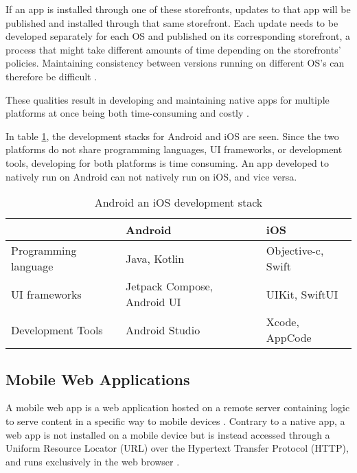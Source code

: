 \documentclass[a4paper,12pt]{article}
\begin{document}
If an app is installed through one of these storefronts, updates to that app will be published and installed through that same storefront. Each update needs to be developed separately for each OS and published on its corresponding storefront, a process that might take different amounts of time depending on the storefronts’ policies. Maintaining consistency between versions running on different OS’s can therefore be difficult \cite{comp_mobile_apps_crossplatform}.

These qualities result in developing and maintaining native apps for multiple platforms at once being both time-consuming and costly \cite{mobile_web_apps_2013}.

In table \ref{tab:devstack}, the development stacks for Android and iOS are seen. Since the two platforms do not share programming languages, UI frameworks, or development tools, developing for both platforms is time consuming. An app developed to natively run on Android can not natively run on iOS, and vice versa.

\begin{table}[h]
\centering
{}
\begin{tabular}{|l|l|l|}
\hline
\rowcolor[HTML]{656565} 
\multicolumn{1}{|c|}{\cellcolor[HTML]{656565}} & {\color[HTML]{FFFFFF} Android} & {\color[HTML]{FFFFFF} iOS} \\ \hline
Programming language & Java, Kotlin & Objective-c, Swift \\
UI frameworks & Jetpack Compose, Android UI & UIKit, SwiftUI \\
Development Tools & Android Studio & Xcode, AppCode \\ \hline
\end{tabular}
\caption{Android an iOS development stack \cite{mobile_tech_stacks}}
\label{tab:devstack}
\end{table}

\subsection{Mobile Web Applications}
A mobile web app is a web application hosted on a remote server containing logic to serve content in a specific way to mobile devices \cite{crossplatform_2012, mobile_web_apps_2013}. Contrary to a native app, a web app is not installed on a mobile device but is instead accessed through a Uniform Resource Locator (URL) over the Hypertext Transfer Protocol (HTTP), and runs exclusively in the web browser \cite{crossplatform_taxonomy, crossplatform_2012}. 
\end{document}
